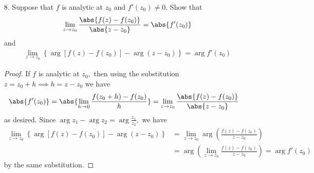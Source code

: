 \documentclass{article}
\begin{document}
\begin{itemize}
	\item[8.] Suppose that $f$ is analytic at $z_0$ and $f'(z_0)\neq 0.$ Show that
		\begin{align*}
			\lim_{z\to z_0} \frac{\abs{f(z)-f(z_0)}}{\abs{z-z_0}} = \abs{f'(z_0)}
		\end{align*}
		and
		\begin{align*}
			\lim_{z\to z_0} \left\{ \arg\left[ f(z)-f(z_0) \right]-\arg(z-z_0) \right\} = \arg f'(z_0)
		\end{align*}
		\begin{proof}
			If $f$ is analytic at $z_0,$ then using the substitution $z=z_0+h\implies h=z-z_0$ we have
			\begin{align*}
				\abs{f'(z_0)} &= \abs{\lim_{h\to 0}\frac{f(z_0+h)-f(z_0)}{h}} = \lim_{z\to z_0} \frac{\abs{f(z)-f(z_0)}}{\abs{z-z_0}}
			\end{align*}
			as desired. Since $\arg z_1-\arg z_2 = \arg \frac{z_1}{z_2},$ we have
			\begin{align*}
				\lim_{z\to z_0} \left\{ \arg\left[ f(z)-f(z_0) \right] - \arg(z-z_0) \right\} &= \lim_{z\to z_0} \arg\left( \frac{f(z)-f(z_0)}{z-z_0} \right) \\
				&= \arg \left( \lim_{z\to z_0} \frac{f(z)-f(z_0)}{z-z_0} \right) = \arg f'(z_0)
			\end{align*}
			by the same substitution.
		\end{proof}


\end{itemize}
\end{document}
